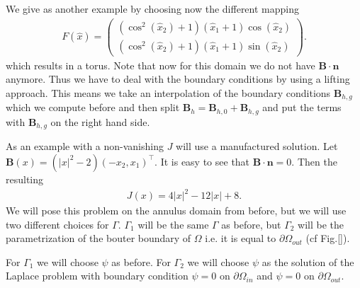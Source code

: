 \documentclass[../master_thesis.tex]{subfiles}
\begin{document}
We give as another example by choosing now the different mapping 
\begin{align*}
    F(\hat{x}) = \begin{pmatrix}
        (\cos^2(\hat{x}_2 ) + 1 )(\hat{x}_1 + 1)\cos(\hat{x}_2 ) 
        \\ (\cos^2(\hat{x}_2 ) + 1 ) (\hat{x}_1 + 1)\sin(\hat{x}_2 ) 
    \end{pmatrix}.
\end{align*}
which results in a torus. Note that now for this domain we do not have 
$\mathbf{B}\cdot \mathbf{n}$ anymore. Thus we have to deal with the boundary conditions 
by using a lifting approach. This means we take an interpolation of the boundary conditions 
$\mathbf{B}_{h,g}$ which we compute before and then split
$\mathbf{B}_{h} = \mathbf{B}_{h,0} + \mathbf{B}_{h,g}$ and put the terms 
with $\mathbf{B}_{h,g}$ on the right hand side. 

As an example with a non-vanishing $J$ will use a manufactured solution. 
Let $\mathbf{B}(x) = (|x|^2 -2) (-x_2,x_1)^\top$. It is easy to see that 
$\mathbf{B}\cdot \mathbf{n} = 0$. 
Then the resulting 
\begin{align*}
    J(x) = 4 |x|^2 - 12 |x| + 8.
\end{align*}
We will pose this problem on the annulus domain from before, but we will use two 
different choices for $\Gamma$. 
$\Gamma_1$ will be the same $\Gamma$ as before, but $\Gamma_2$ will 
be the parametrization of the bouter boundary of $\Omega$ i.e. 
it is equal to $\partial\Omega_{out}$ (cf Fig.\ref{}).

For $\Gamma_1$ we will choose $\psi$ as before. For $\Gamma_2$ we will choose 
$\psi$ as the solution of the Laplace problem with boundary condition 
$\psi=0$ on $\partial\Omega_{in}$ and $\psi=0$ on $\partial\Omega_{out}$.
\end{document}
